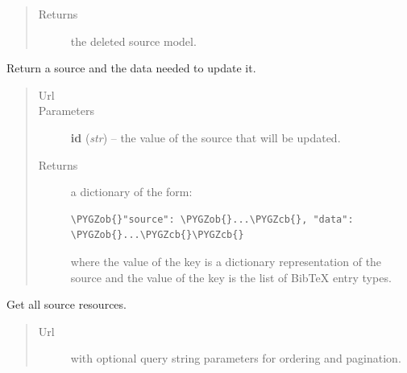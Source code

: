 \documentclass[letterpaper,10pt,english]{sphinxmanual}
\def\PYGZob{\char`\{}
\def\PYGZcb{\char`\}}
\begin{document}
\begin{fulllineitems}
\begin{fulllineitems}
\begin{quote}
\begin{description}
\item[{Returns}] \leavevmode
the deleted source model.

\end{description}\end{quote}

\end{fulllineitems}


\begin{fulllineitems}
\label{api:onlinelinguisticdatabase.controllers.sources.SourcesController.edit}
Return a source and the data needed to update it.
\begin{quote}\begin{description}
\item[{Url }] \leavevmode
{}

\item[{Parameters}] \leavevmode
\textbf{id} (\emph{str}) -- the  value of the source that will be updated.

\item[{Returns}] \leavevmode

a dictionary of the form:

\begin{Verbatim}[commandchars=\\\{\}]
\PYGZob{}"source": \PYGZob{}...\PYGZcb{}, "data": \PYGZob{}...\PYGZcb{}\PYGZcb{}
\end{Verbatim}

where the value of the  key is a dictionary
representation of the source and the value of the  key
is the list of BibTeX entry types.


\end{description}\end{quote}

\end{fulllineitems}


\begin{fulllineitems}
\label{api:onlinelinguisticdatabase.controllers.sources.SourcesController.index}
Get all source resources.
\begin{quote}\begin{description}
\item[{Url }] \leavevmode
{} with optional query string parameters for
ordering and pagination.


\end{description}
\end{quote}
\end{fulllineitems}
\end{fulllineitems}
\end{document}
